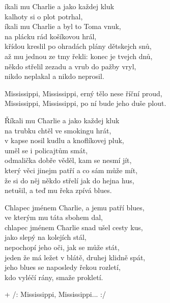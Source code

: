 
\ve{}
íkali mu Charlie a jako každej kluk\\
kalhoty si o plot potrhal,\\
íkali mu Charlie a byl to Toma vnuk,\\
na plácku rád košíkovou hrál,\\
křídou kreslil po ohradách plány dětskejch snů,\\
až mu jednou ze tmy řekli: konec je tvejch dnů,\\
někdo střelil zezadu a vrub do pažby vryl,\\
nikdo neplakal a nikdo neprosil.

\cho{}
Mississippi, Mississippi, erný tělo nese říční proud,\\
Mississippi, Mississippi, po ní bude jeho duše plout.

\ve{}
Říkali mu Charlie a jako každej kluk\\
na trubku chtěl ve smokingu hrát,\\
v kapse nosil kudlu a knoflíkovej pluk,\\
uměl se i policajtům smát,\\
odmalička dobře věděl, kam se nesmí jít,\\
který věci jinejm patří a co sám může mít,\\
že si do něj někdo střelí jak do hejna hus,\\
netušil, a teď mu řeka zpívá blues.

\cho{}

\ve{}
Chlapec jménem Charlie, a jemu patří blues,\\
ve kterým mu táta sbohem dal,\\
chlapec jménem Charlie snad ušel cesty kus,\\
jako slepý na kolejích stál,\\
nepochopí jeho oči, jak se může stát,\\
jeden že má ležet v blátě, druhej klidně spát,\\
jeho blues se naposledy řekou rozletí,\\
kdo vyléčí rány, smaže prokletí.

\cho{}

\cho{}
+ /: Mississippi, Mississippi... :/

\esong